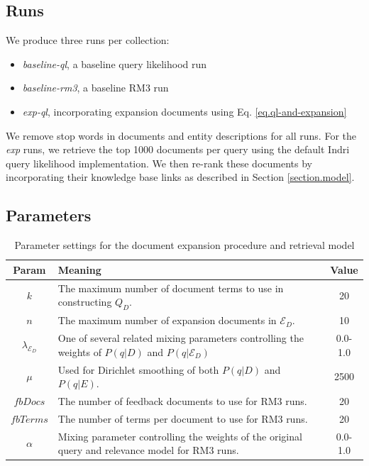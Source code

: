 \documentclass{article}
\begin{document}
\subsection{Runs}\label{section.evaluation.runs}


We produce three runs per collection:
\begin{itemize}
	\item \textit{baseline-ql}, a baseline query likelihood run
	\item \textit{baseline-rm3}, a baseline RM3 run
	\item \textit{exp-ql}, incorporating expansion documents using Eq. \ref{eq.ql-and-expansion}
\end{itemize}

We remove stop words in documents and entity descriptions for all runs. For the \textit{exp} runs, we retrieve the top 1000 documents per query using the default Indri query likelihood implementation. We then re-rank these documents by incorporating their knowledge base links as described in Section \ref{section.model}.

\subsection{Parameters}\label{section.evaluation.parameters}

\begin{table}[htb]
\centering
\begin{tabular}{|c|p{}|c|} \hline
{\bf Param} & {\bf Meaning} & {\bf Value} \\ \hline
$k$ & The maximum number of document terms to use in constructing $Q_D$. & 20 \\ \hline
$n$ & The maximum number of expansion documents in $\mathcal{E}_D$. & 10 \\ \hline
$\lambda_{\mathcal{E}_D}$ & One of several related mixing parameters controlling the weights of $P(q|D)$ and $P(q|\mathcal{E}_D)$ & 0.0-1.0 \\ \hline
$\mu$ & Used for Dirichlet smoothing of both $P(q|D)$ and $P(q|E)$. & 2500 \\ \hline
$fbDocs$ & The number of feedback documents to use for RM3 runs. & 20 \\ \hline
$fbTerms$ & The number of terms per document to use for RM3 runs. & 20 \\ \hline
$\alpha$ & Mixing parameter controlling the weights of the original query and relevance model for RM3 runs. & 0.0-1.0 \\ \hline
\end{tabular}
\caption{Parameter settings for the document expansion procedure and retrieval model}
\label{table.parameters}
\end{table}
\end{document}
